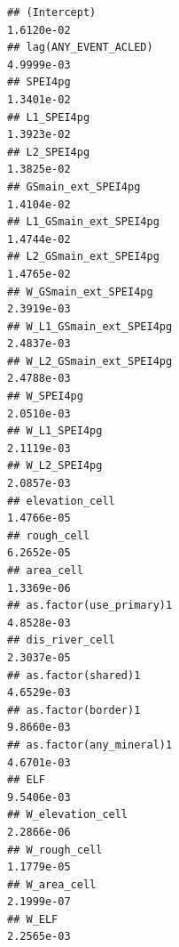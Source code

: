 \documentclass[
  a4paper,
]{article}
\begin{document}
\begin{verbatim}
## (Intercept)                                                                        1.6120e-02
## lag(ANY_EVENT_ACLED)                                                               4.9999e-03
## SPEI4pg                                                                            1.3401e-02
## L1_SPEI4pg                                                                         1.3923e-02
## L2_SPEI4pg                                                                         1.3825e-02
## GSmain_ext_SPEI4pg                                                                 1.4104e-02
## L1_GSmain_ext_SPEI4pg                                                              1.4744e-02
## L2_GSmain_ext_SPEI4pg                                                              1.4765e-02
## W_GSmain_ext_SPEI4pg                                                               2.3919e-03
## W_L1_GSmain_ext_SPEI4pg                                                            2.4837e-03
## W_L2_GSmain_ext_SPEI4pg                                                            2.4788e-03
## W_SPEI4pg                                                                          2.0510e-03
## W_L1_SPEI4pg                                                                       2.1119e-03
## W_L2_SPEI4pg                                                                       2.0857e-03
## elevation_cell                                                                     1.4766e-05
## rough_cell                                                                         6.2652e-05
## area_cell                                                                          1.3369e-06
## as.factor(use_primary)1                                                            4.8528e-03
## dis_river_cell                                                                     2.3037e-05
## as.factor(shared)1                                                                 4.6529e-03
## as.factor(border)1                                                                 9.8660e-03
## as.factor(any_mineral)1                                                            4.6701e-03
## ELF                                                                                9.5406e-03
## W_elevation_cell                                                                   2.2866e-06
## W_rough_cell                                                                       1.1779e-05
## W_area_cell                                                                        2.1999e-07
## W_ELF                                                                              2.2565e-03

\end{verbatim}
\end{document}
